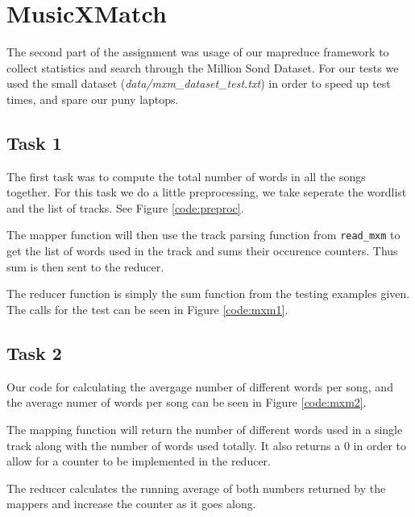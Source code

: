 \section{MusicXMatch}

The second part of the assignment was usage of our mapreduce framework to
collect statistics and search through the Million Sond Dataset.  For our tests
we used the small dataset (\textit{data/mxm\_dataset\_test.txt}) in order to speed
up test times, and spare our puny laptops.

\subsection{Task 1}
The first task was to compute the total number of words in all the songs
together. For this task we do a little preprocessing, we take seperate the
wordlist and the list of tracks. See Figure \ref{code:preproc}.


The mapper function will then use the track parsing function from
\texttt{read\_mxm} to get the list of words used in the track and sums their
occurence counters. Thus sum is then sent to the reducer.

The reducer function is simply the sum function from the testing examples
given. The calls for the test can be seen in Figure \ref{code:mxm1}.


\subsection{Task 2}
Our code for calculating the avergage number of different words per song, and
the average numer of words per song can be seen in Figure \ref{code:mxm2}.


The mapping function will return the number of different words used in a single
track along with the number of words used totally. It also returns a $0$ in
order to allow for a counter to be implemented in the reducer.

The reducer calculates the running average of both numbers returned by the
mappers and increase the counter as it goes along.

